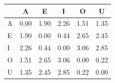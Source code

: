 \begin{tabular}{lccccc}
\toprule
\rowcolor{col01}
 & A & E & I & O & U \\
\midrule
A & 0.00 & 1.90 & 2.26 & 1.51 & 1.35 \\
E & 1.90 & 0.00 & 0.44 & 2.65 & 2.45 \\
I & 2.26 & 0.44 & 0.00 & 3.06 & 2.85 \\
O & 1.51 & 2.65 & 3.06 & 0.00 & 0.22 \\
U & 1.35 & 2.45 & 2.85 & 0.22 & 0.00 \\
\bottomrule
\end{tabular}
